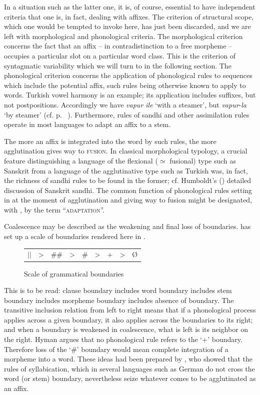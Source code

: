 In a situation such as the latter one, it is, of course, essential to have independent criteria that one is, in fact, dealing with affixes. The criterion of structural scope, which one would be tempted to invoke here, has just been discarded, and we are left with morphological and phonological criteria. The morphological criterion concerns the fact that an affix -- in contradistinction to a free morpheme -- occupies a particular slot on a particular word class. This is the criterion of syntagmatic variability which we will turn to in the following section. The phonological criterion concerns the application of phonological rules to sequences which include the potential affix, such rules being otherwise known to apply to words. Turkish vowel harmony is an example; its application includes suffixes, but not postpositions. Accordingly we have \textit{vapur ile} ‘with a steamer’, but \textit{vapur}{}-\textit{la} ‘by steamer’ (cf. p.~\pageref{page89}\chk%
 ). Furthermore, rules of sandhi and other assimilation rules operate in most languages to adapt an affix to a stem.

The more an affix is integrated into the word by such rules, the more agglutination gives way to \textsc{fusion}. In classical morphological typology, a crucial feature distinguishing a language of the flexional (${\simeq}$ fusional) type such as Sanskrit from a language of the agglutinative type such as Turkish was, in fact, the richness of sandhi rules to be found in the former; cf. Humboldt's (\citeyear[506--511]{Humboldt1836}) detailed discussion of Sanskrit sandhi. The common function of phonological rules setting in at the moment of agglutination and giving way to fusion might be designated, with \citet[17--20]{HeineEtAl1984}, by the term ``\textsc{adaptation}''.

Coalescence may be described as the weakening and final loss of boundaries. \citet[esp. §4]{Hyman1978} has set up a scale of boundaries rendered here in .

\begin{figure}
\begin{tabular}{ccccccccc}
\setlength{\tabcolsep}{2em}
$||$ & {\textgreater} & \#\# & {\textgreater} & \# & {\textgreater} & + & {\textgreater} & Ø
\end{tabular}
\caption{Scale of grammatical boundaries}\label{F10}
\end{figure}

\noindent This is to be read: clause boundary includes word boundary includes stem boundary includes morpheme boundary includes absence of boundary. The transitive inclusion relation from left to right means that if a phonological process applies across a given boundary, it also applies across the boundaries to its right; and when a boundary is weakened in coalescence, what is left is its neighbor on the right. Hyman argues that no phonological rule refers to the ‘+’ boundary. Therefore loss of the ‘\#’ boundary would mean complete integration of a morpheme into a word. These ideas had been prepared by \citet[211]{Kuryłowicz1948}, who showed that the rules of syllabication, which in several languages such as German do not cross the word (or stem) boundary, nevertheless seize whatever comes to be agglutinated as an affix.

